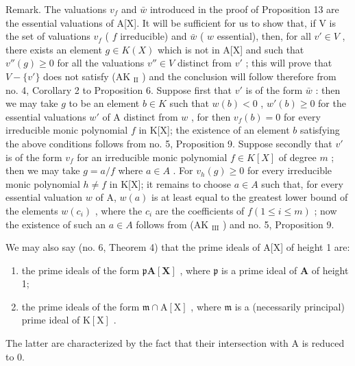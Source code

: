 Remark. The valuations \(v_f\) and \(\bar{w}\) introduced in the proof of Proposition 13 are the essential valuations of A{[}X{]}. It will be sufficient for us to show that, if V is the set of valuations \(v_f\) ( \(f\) irreducible) and \(\bar{w}\) ( \(w\) essential), then, for all \(v' \in V\) , there exists an element \(g \in K(X)\) which is not in A{[}X{]} and such that \(v''(g) \geqslant 0\) for all the valuations \(v'' \in V\) distinct from \(v'\) ; this will prove that \(V - \{v'\}\) does not satisfy (AK \(_{\text{II}}\) ) and the conclusion will follow therefore from no. 4, Corollary 2 to Proposition 6. Suppose first that \(v'\) is of the form \(\bar{w}\) : then we may take \(g\) to be an element \(b \in K\) such that \(w(b) < 0\) , \(w'(b) \geqslant 0\) for the essential valuations \(w'\) of A distinct from \(w\) , for then \(v_f(b) = 0\) for every irreducible monic polynomial \(f\) in K{[}X{]}; the existence of an element \(b\) satisfying the above conditions follows from no. 5, Proposition 9. Suppose secondly that \(v'\) is of the form \(v_f\) for an irreducible monic polynomial \(f \in K[X]\) of degree \(m\) ; then we may take \(g = a/f\) where \(a \in A\) . For \(v_h(g) \geqslant 0\) for every irreducible monic polynomial \(h \neq f\) in K{[}X{]}; it remains to choose \(a \in A\) such that, for every essential valuation \(w\) of A, \(w(a)\) is at least equal to the greatest lower bound of the elements \(w(c_i)\) , where the \(c_i\) are the coefficients of \(f (1 \leqslant i \leqslant m)\) ; now the existence of such an \(a \in A\) follows from (AK \(_{\text{III}}\) ) and no. 5, Proposition 9.

We may also say (no. 6, Theorem 4) that the prime ideals of A{[}X{]} of height 1 are:

\begin{enumerate}
\def\labelenumi{(\arabic{enumi})}
\item
  the prime ideals of the form \(\mathfrak{p}\mathbf{A}[\mathbf{X}]\) , where \(\mathfrak{p}\) is a prime ideal of \(\mathbf{A}\) of height 1;
\item
  the prime ideals of the form \(\mathfrak{m} \cap \mathrm{A}[\mathrm{X}]\) , where \(\mathfrak{m}\) is a (necessarily principal) prime ideal of \(\mathrm{K}[\mathrm{X}]\) .
\end{enumerate}

The latter are characterized by the fact that their intersection with A is reduced to 0.

